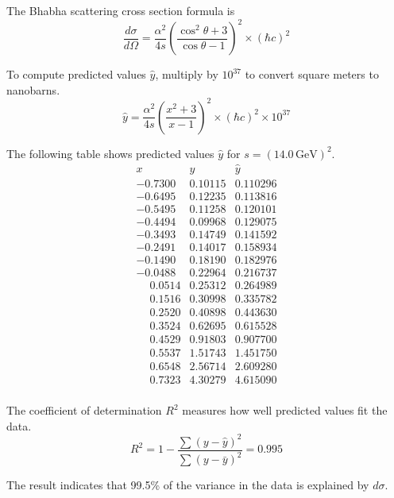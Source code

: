 The Bhabha scattering cross section formula is
\begin{equation*}
\frac{d\sigma}{d\Omega}
=\frac{\alpha^2}{4s}
\left(\frac{\cos^2\theta+3}{\cos\theta-1}\right)^2\times(\hbar c)^2
\end{equation*}

To compute predicted values $\hat{y}$, multiply by $10^{37}$ to convert square meters to nanobarns.
\begin{equation*}
\hat{y}
=\frac{\alpha^2}{4s}
\left(\frac{x^2+3}{x-1}\right)^2
\times(\hbar c)^2
\times10^{37}
\end{equation*}

The following table shows predicted values $\hat{y}$ for $s=(14.0\,\text{GeV})^2$.
\begin{equation*}
\begin{matrix}
x & y & \hat{y}\\
-0.7300 & 0.10115 & 0.110296\\
-0.6495 & 0.12235 & 0.113816\\
-0.5495 & 0.11258 & 0.120101\\
-0.4494 & 0.09968 & 0.129075\\
-0.3493 & 0.14749 & 0.141592\\
-0.2491 & 0.14017 & 0.158934\\
-0.1490 & 0.18190 & 0.182976\\
-0.0488 & 0.22964 & 0.216737\\
\phantom{+}0.0514 & 0.25312 & 0.264989\\
\phantom{+}0.1516 & 0.30998 & 0.335782\\
\phantom{+}0.2520 & 0.40898 & 0.443630\\
\phantom{+}0.3524 & 0.62695 & 0.615528\\
\phantom{+}0.4529 & 0.91803 & 0.907700\\
\phantom{+}0.5537 & 1.51743 & 1.451750\\
\phantom{+}0.6548 & 2.56714 & 2.609280\\
\phantom{+}0.7323 & 4.30279 & 4.615090\\
\end{matrix}
\end{equation*}

The coefficient of determination $R^2$ measures how well predicted values fit the data.
\begin{equation*}
R^2=1-\frac{\sum(y-\hat{y})^2}{\sum(y-\bar{y})^2}=0.995
\end{equation*}

The result indicates that 99.5\% of the variance in the data is explained by $d\sigma$.


